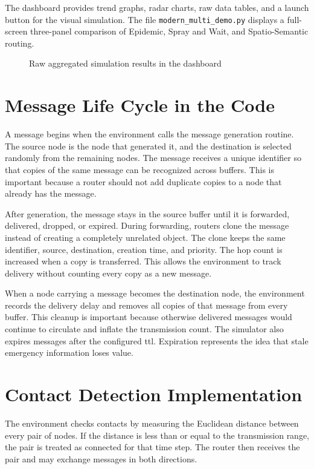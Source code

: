 The dashboard provides trend graphs, radar charts, raw data tables, and a launch button for the visual simulation. The file \verb|modern_multi_demo.py| displays a full-screen three-panel comparison of Epidemic, Spray and Wait, and Spatio-Semantic routing.

\begin{figure}[h!]
    \centering
    \caption{Raw aggregated simulation results in the dashboard}
    \label{fig:raw_data_placeholder}
\end{figure}

\section{Message Life Cycle in the Code}
A message begins when the environment calls the message generation routine. The source node is the node that generated it, and the destination is selected randomly from the remaining nodes. The message receives a unique identifier so that copies of the same message can be recognized across buffers. This is important because a router should not add duplicate copies to a node that already has the message.

After generation, the message stays in the source buffer until it is forwarded, delivered, dropped, or expired. During forwarding, routers clone the message instead of creating a completely unrelated object. The clone keeps the same identifier, source, destination, creation time, and priority. The hop count is increased when a copy is transferred. This allows the environment to track delivery without counting every copy as a new message.

When a node carrying a message becomes the destination node, the environment records the delivery delay and removes all copies of that message from every buffer. This cleanup is important because otherwise delivered messages would continue to circulate and inflate the transmission count. The simulator also expires messages after the configured \ac{ttl}. Expiration represents the idea that stale emergency information loses value.

\section{Contact Detection Implementation}
The environment checks contacts by measuring the Euclidean distance between every pair of nodes. If the distance is less than or equal to the transmission range, the pair is treated as connected for that time step. The router then receives the pair and may exchange messages in both directions.

